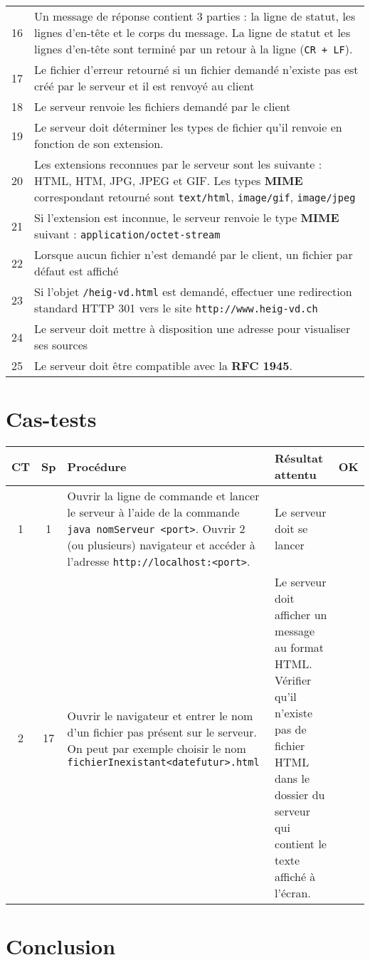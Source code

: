 \documentclass[a4paper, 11pt]{article}
\begin{document}
\begin{tabular}{ c | p{14cm} }
16 & Un message de réponse contient 3 parties : la ligne de statut, les lignes 
     d'en-tête et le corps du message. La ligne de statut et les lignes d'en-tête
     sont terminé par un retour à la ligne (\texttt{CR + LF}). \\
17 & Le fichier d'erreur retourné si un fichier demandé n'existe pas est créé 
     par le serveur et il est renvoyé au client \\
18 & Le serveur renvoie les fichiers demandé par le client \\
19 & Le serveur doit déterminer les types de fichier qu'il renvoie en fonction 
     de son extension. \\
20 & Les extensions reconnues par le serveur sont les suivante : HTML, HTM, JPG, 
     JPEG et GIF.  Les types \textbf{MIME} correspondant retourné sont 
     \texttt{text/html}, \texttt{image/gif}, \texttt{image/jpeg} \\
21 & Si l'extension est inconnue, le serveur renvoie le type \textbf{MIME} suivant : 
     \texttt{application/octet-stream} \\
22 & Lorsque aucun fichier n'est demandé par le client, un fichier par défaut est
     affiché \\
23 & Si l'objet \texttt{/heig-vd.html} est demandé, effectuer une redirection
     standard HTTP 301 vers le site \texttt{http://www.heig-vd.ch} \\
24 & Le serveur doit mettre à disposition une adresse pour visualiser ses sources \\
25 & Le serveur doit être compatible avec la \textbf{RFC 1945}. \\

\hline
\end{tabular}

\section{Cas-tests}

\begin{tabular}{ c | c | p{7cm} | p{6cm} | c }
CT & Sp & Procédure & Résultat attentu & OK\\
\hline
\hline
1 & 1 & Ouvrir la ligne de commande et lancer le serveur à l'aide de la commande 
        \texttt{java nomServeur <port>}. Ouvrir 2 (ou plusieurs) navigateur et accéder
        à l'adresse \texttt{http://localhost:<port>}.  
        & Le serveur doit se lancer & \\
2 & 17 & Ouvrir le navigateur et entrer le nom d'un fichier pas présent sur le
         serveur. On peut par exemple
         choisir le nom \texttt{fichierInexistant<datefutur>.html} 
         & Le serveur doit afficher un message au format HTML. Vérifier qu'il 
         n'existe pas de fichier HTML dans le dossier du serveur qui contient le 
         texte affiché à l'écran. \\
         
        
\hline
\end{tabular}

\section{Conclusion}


\end{document}
